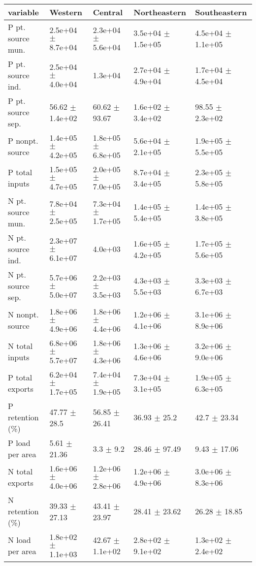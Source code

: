 \documentclass{article}
\begin{document}
\begin{landscape}
\begin{table}[!h]
\centering
\begin{tabular}{lllll}
\toprule
variable & Western & Central & Northeastern & Southeastern\\
\midrule
P pt. source mun. & 2.5e+04 $\pm$ 8.7e+04 & 2.3e+04 $\pm$ 5.6e+04 & 3.5e+04 $\pm$ 1.5e+05 & 4.5e+04 $\pm$ 1.1e+05\\
P pt. source ind. & 2.5e+04 $\pm$ 4.0e+04 & 1.3e+04 & 2.7e+04 $\pm$ 4.9e+04 & 1.7e+04 $\pm$ 4.5e+04\\
P pt. source sep. & 56.62 $\pm$ 1.4e+02 & 60.62 $\pm$ 93.67 & 1.6e+02 $\pm$ 3.4e+02 & 98.55 $\pm$ 2.3e+02\\
P nonpt. source & 1.4e+05 $\pm$ 4.2e+05 & 1.8e+05 $\pm$ 6.8e+05 & 5.6e+04 $\pm$ 2.1e+05 & 1.9e+05 $\pm$ 5.5e+05\\
P total inputs & 1.5e+05 $\pm$ 4.7e+05 & 2.0e+05 $\pm$ 7.0e+05 & 8.7e+04 $\pm$ 3.4e+05 & 2.3e+05 $\pm$ 5.8e+05\\
\addlinespace
N pt. source mun. & 7.8e+04 $\pm$ 2.5e+05 & 7.3e+04 $\pm$ 1.7e+05 & 1.4e+05 $\pm$ 5.4e+05 & 1.4e+05 $\pm$ 3.8e+05\\
N pt. source ind. & 2.3e+07 $\pm$ 6.1e+07 & 4.0e+03 & 1.6e+05 $\pm$ 4.2e+05 & 1.7e+05 $\pm$ 5.6e+05\\
N pt. source sep. & 5.7e+06 $\pm$ 5.0e+07 & 2.2e+03 $\pm$ 3.5e+03 & 4.3e+03 $\pm$ 5.5e+03 & 3.3e+03 $\pm$ 6.7e+03\\
N nonpt. source & 1.8e+06 $\pm$ 4.9e+06 & 1.8e+06 $\pm$ 4.4e+06 & 1.2e+06 $\pm$ 4.1e+06 & 3.1e+06 $\pm$ 8.9e+06\\
N total inputs & 6.8e+06 $\pm$ 5.7e+07 & 1.8e+06 $\pm$ 4.3e+06 & 1.3e+06 $\pm$ 4.6e+06 & 3.2e+06 $\pm$ 9.0e+06\\
\addlinespace
P total exports & 6.2e+04 $\pm$ 1.7e+05 & 7.4e+04 $\pm$ 1.9e+05 & 7.3e+04 $\pm$ 3.1e+05 & 1.9e+05 $\pm$ 6.3e+05\\
P retention (\%) & 47.77 $\pm$ 28.5 & 56.85 $\pm$ 26.41 & 36.93 $\pm$ 25.2 & 42.7 $\pm$ 23.34\\
P load per area & 5.61 $\pm$ 21.36 & 3.3 $\pm$ 9.2 & 28.46 $\pm$ 97.49 & 9.43 $\pm$ 17.06\\
N total exports & 1.6e+06 $\pm$ 4.0e+06 & 1.2e+06 $\pm$ 2.8e+06 & 1.2e+06 $\pm$ 4.9e+06 & 3.0e+06 $\pm$ 8.3e+06\\
N retention (\%) & 39.33 $\pm$ 27.13 & 43.41 $\pm$ 23.97 & 28.41 $\pm$ 23.62 & 26.28 $\pm$ 18.85\\
N load per area & 1.8e+02 $\pm$ 1.1e+03 & 42.67 $\pm$ 1.1e+02 & 2.8e+02 $\pm$ 9.1e+02 & 1.3e+02 $\pm$ 2.4e+02\\
\bottomrule
\end{tabular}
\end{table}
\end{landscape}
\end{document}
